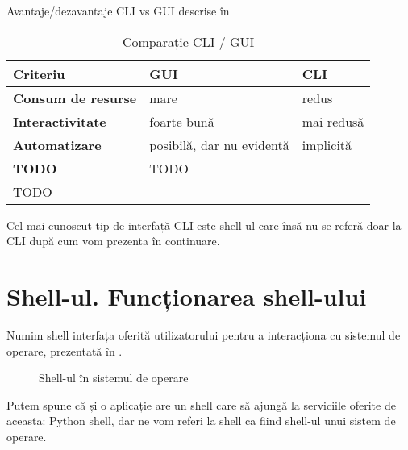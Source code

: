 Avantaje/dezavantaje CLI vs GUI descrise în 

\begin{table}[!htb]
  \caption{Comparație CLI / GUI}
  \begin{center}
    \begin{tabular}{ p{} p{} p{} }
      \toprule
        \textbf{Criteriu} &
        \textbf{GUI} &
        \textbf{CLI} \\
      \midrule
        \textbf{Consum de resurse} &
        mare &
        redus \\

        \textbf{Interactivitate} &
        foarte bună &
        mai redusă \\

        \textbf{Automatizare} &
        posibilă, dar nu evidentă &
        implicită \\

        \textbf{TODO} &
        TODO \\
        TODO \\
      \bottomrule
    \end{tabular}
    \label{tab:cli:cli-vs-gui}
  \end{center}
\end{table}

Cel mai cunoscut tip de interfață CLI este shell-ul care însă nu se referă doar la CLI după cum vom prezenta în continuare.

\section{Shell-ul. Funcționarea shell-ului}
\label{sec:cli-shell}

Numim shell interfața oferită utilizatorului pentru a interacționa cu sistemul
de operare, prezentată în .

\begin{figure}[htbp]
  \centering
  \def\svgwidth{\columnwidth}
  
  \caption{Shell-ul în sistemul de operare}
  \label{fig:cli:shell-overview}
\end{figure}

Putem spune că și o aplicație are un shell care să ajungă la serviciile oferite
de aceasta: Python shell, dar ne vom referi la shell ca fiind shell-ul unui
sistem de operare.

